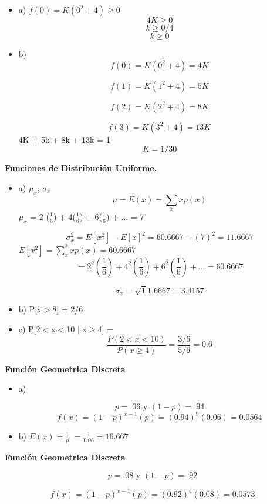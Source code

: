 \documentclass{../oxmathproblems}
\begin{document}
\begin{questions}

\begin{itemize}
\item a) $f(0) = K(0^2 + 4) \geq 0 $
$$ 4K \geq 0 $$
 $$ k \geq 0/ 4$$
$$ k \geq 0 $$

\item  b) 
$$f(0) = K(0^2 + 4) =  4K $$

$$f(1) = K(1^2 + 4) =  5K $$

$$f(2) = K(2^2 + 4) =  8K $$

$$f(3) = K(3^2 + 4) =  13K $$
4K + 5k + 8k + 13k = 1
$$ K = 1/30 $$
\end{itemize}

\miquestion\textbf{Funciones de Distribución Uniforme. }
\begin{itemize}
\item  a) $\mu_x$, $\sigma_x$
$$ \mu = E(x)= \sum_x xp(x)$$ 
 $\mu_x$ = 2 ($\frac{1}{6} $) + 4($\frac{1}{6} $) + 6($\frac{1}{6} $) + ... = 7 

$$ \sigma_x^2 = E[x^2]-E[x]^2 = 60.6667 - (7)^2 = 11.6667 $$ 
 $ E[x^2] = \sum_x^2 xp(x)  = 60.6667 $ 
 $$ = 2^2 (\frac{1}{6}) + 4^2(\frac{1}{6}) + 6^2(\frac{1}{6}) + ... =  60.6667 $$ 
 
 $$ \sigma_x  = \sqrt11.6667 = 3.4157 $$ 


\item  b) P[x$>$8] = 2/6

\item  c) P[2$<$x$<$10 $\mid$ x$\geq$4]
= $$  \frac{P(2 < x <10)}{P (x \geq 4)} = \frac{3/6}{5/6} = 0.6 $$ 
\end{itemize}

\miquestion\textbf { Función Geometrica Discreta}
\begin{itemize}
\item a)


$$ p = .06 \text{ y }
(1 - p )= .94 $$ 
$$ f(x) = (1-p)^{x-1} (p)  = (0.94)^9(0.06) = 0.0564 $$
\item b) 
$ E(x) = \frac{1}{p} $ 
$ = \frac{1}{0.06} = 16.667 $
\end{itemize}

\miquestion\textbf { Función Geometrica Discreta}

$$ p = .08 \text{ y }
(1 - p )= .92 $$ 

$$ f(x) = (1-p)^{x-1} (p)  = (0.92)^4(0.08) = 0.0573 $$

\end {questions}
\end{document}

